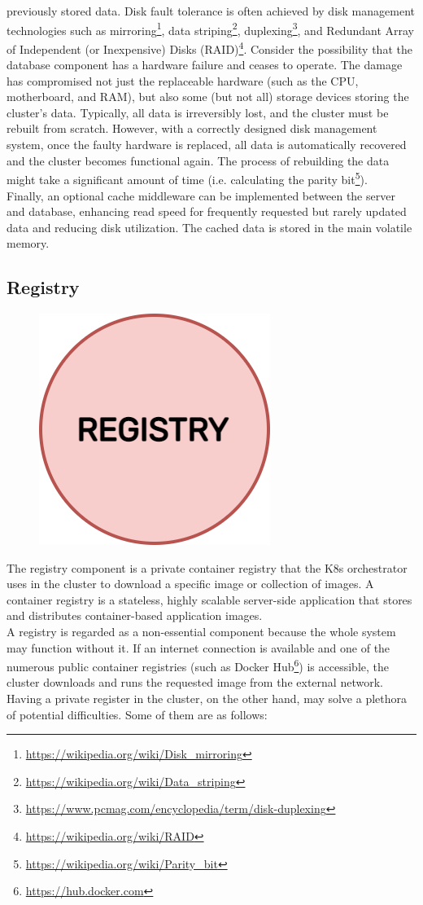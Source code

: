 previously stored data. Disk fault tolerance is often achieved by disk
management technologies such as mirroring\footnote{\url{https://wikipedia.org/wiki/Disk_mirroring}},
data striping\footnote{\url{https://wikipedia.org/wiki/Data_striping}},
duplexing\footnote{\url{https://www.pcmag.com/encyclopedia/term/disk-duplexing}},
and Redundant Array of Independent (or Inexpensive) Disks (RAID)\footnote{\url{https://wikipedia.org/wiki/RAID}}\cite{disk_management_technologies}.
Consider the possibility that the database component has a hardware failure and ceases
to operate. The damage has compromised not just the replaceable hardware (such as
the CPU, motherboard, and RAM), but also some (but not all) storage devices storing
the cluster's data. Typically, all data is irreversibly lost, and the cluster
must be rebuilt from scratch. However, with a correctly designed disk management
system, once the faulty hardware is replaced, all data is automatically
recovered and the cluster becomes functional again. The process of rebuilding the
data might take a significant amount of time (i.e. calculating the parity bit\footnote{\url{https://wikipedia.org/wiki/Parity_bit}}).
\\ %
Finally, an optional cache middleware can be implemented between the server and database,
enhancing read speed for frequently requested but rarely updated data and
reducing disk utilization. The cached data is stored in the main volatile memory.

\subsection{Registry}
\label{subsec:architecture_components_registry}

\begin{figure}
  \centering
  \includegraphics[width=.2\textwidth]{images/architecture/registry.png}
\end{figure}


The registry component is a private container registry that the K8s orchestrator
uses in the cluster to download a specific image or collection of images. A container
registry is a stateless, highly scalable server-side application that stores and
distributes container-based application images\cite{docker_registry}. \\ %
A registry is regarded as a non-essential component because the whole system may
function without it. If an internet connection is available and one of the
numerous public container registries (such as Docker Hub\footnote{\url{https://hub.docker.com}})
is accessible, the cluster downloads and runs the requested image from the external
network. Having a private register in the cluster, on the other hand, may solve
a plethora of potential difficulties. Some of them are as follows:

